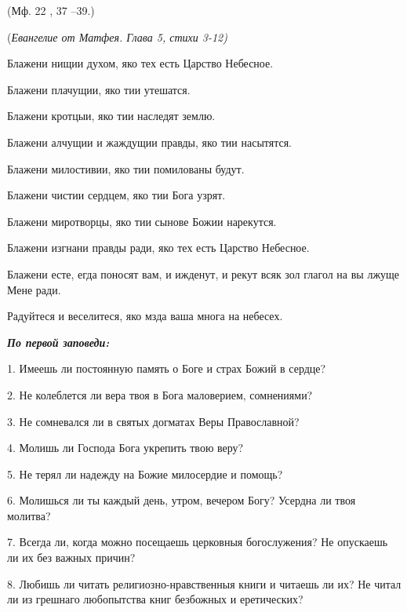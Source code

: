 (Мф. 22 , 37 –39.) 





\mychapterending

 


(\itshape Евангелие от Матфея. Глава 5, стихи 3-12) 

\normalfont{}

Блажени нищии духом, яко тех есть Царство Небесное. 

Блажени плачущии, яко тии утешатся. 

Блажени кротцыи, яко тии наследят землю. 

Блажени алчущии и жаждущии правды, яко тии насытятся. 

Блажени милостивии, яко тии помилованы будут. 

Блажени чистии сердцем, яко тии Бога узрят. 

Блажени миротворцы, яко тии сынове Божии нарекутся. 

Блажени изгнани правды ради, яко тех есть Царство Небесное. 

Блажени есте, егда поносят вам, и ижденут, и рекут всяк зол глагол на вы лжуще Мене ради. 

Радуйтеся и веселитеся, яко мзда ваша многа на небесех. 


\mychapterending

 


\bfseries \itshape По первой заповеди: 

\normalfont{}\normalfont{}1. Имеешь ли постоянную память о Боге и страх Божий в сердце?

2. Не колеблется ли вера твоя в Бога маловерием, сомнениями?

3. Не сомневался ли в святых догматах Веры Православной?

4. Молишь ли Господа Бога укрепить твою веру?

5. Не терял ли надежду на Божие милосердие и помощь?

6. Молишься ли ты каждый день, утром, вечером Богу? Усердна ли твоя молитва?

7. Всегда ли, когда можно посещаешь церковныя богослужения? Не опускаешь ли их без важных причин?

8. Любишь ли читать религиозно-нравственныя книги и читаешь ли их? Не читал ли из грешнаго любопытства книг безбожных и еретических?

